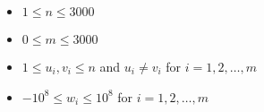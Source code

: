 \begin{itemize}
\tightlist
\item $1 \leq n \leq 3000$
\item $0 \leq m \leq 3000$
\item $1 \leq u_i , v_i \leq n$ and $u_i \neq v_i$ for $i = 1, 2, \ldots, m$
\item $-10^8 \leq w_i \leq 10^8$ for $i = 1, 2, \ldots, m$
\end{itemize}
